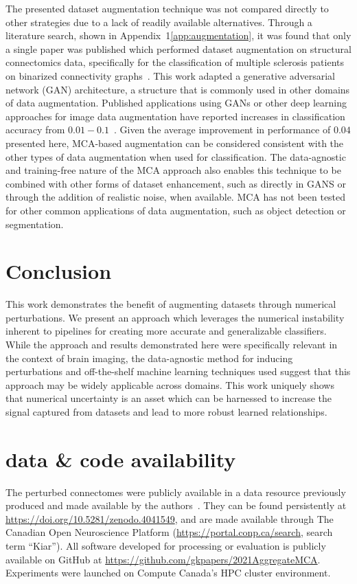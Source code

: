 \documentclass[num-refs]{nbdt-article}
\begin{document}
The presented dataset augmentation technique was not compared directly to other strategies due to a lack of readily available alternatives. Through a literature search, shown in Appendix~1\ref{app:augmentation}, it was found that only a single paper was published which performed dataset augmentation on structural connectomics data, specifically for the classification of multiple sclerosis patients on binarized connectivity graphs~\cite{barile2021data}. This work adapted a generative adversarial network (GAN) architecture, a structure that is commonly used in other domains of data augmentation. Published applications using GANs or other deep learning approaches for image data augmentation have reported increases in classification accuracy from $0.01-0.1$~\cite{shorten2019survey}. Given the average improvement in performance of $0.04$ presented here, MCA-based augmentation can be considered consistent with the other types of data augmentation when used for classification. The data-agnostic and training-free nature of the MCA approach also enables this technique to be combined with other forms of dataset enhancement, such as directly in GANS or through the addition of realistic noise, when available. MCA has not been tested for other common applications of data augmentation, such as object detection or segmentation.

\section{Conclusion}

This work demonstrates the benefit of augmenting datasets through numerical perturbations. We present an approach which leverages the numerical instability inherent to pipelines for creating more accurate and generalizable classifiers. While the approach and results demonstrated here were specifically relevant in the context of brain imaging, the data-agnostic method for inducing perturbations and off-the-shelf machine learning techniques used suggest that this approach may be widely applicable across domains. This work uniquely shows that numerical uncertainty is an asset which can be harnessed to increase the signal captured from datasets and lead to more robust learned relationships.

\section*{data \& code availability}
The perturbed connectomes were publicly available in a data resource previously produced and made available by the authors~\cite{Kiar2020-yz}. They can be found persistently at \url{https://doi.org/10.5281/zenodo.4041549}, and are made available through The Canadian Open Neuroscience Platform (\url{https://portal.conp.ca/search}, search term ``Kiar''). All software developed for processing or evaluation is publicly available on GitHub at \url{https://github.com/gkpapers/2021AggregateMCA}. Experiments were launched on Compute Canada's HPC cluster environment.
\end{document}
